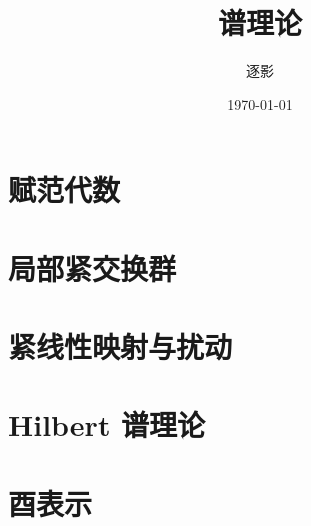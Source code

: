 \documentclass[UTF8,10pt, a4paper, oneside,scheme=plain]{ctexbook}
\author{逐影}
\title{\Huge\textbf{谱理论}}
\date{\today}
\begin{document}
\frontmatter
\maketitle
\tableofcontents
\mainmatter

\part{赋范代数}


\part{局部紧交换群}


\part{紧线性映射与扰动}


\part{Hilbert 谱理论}


\part{酉表示}


\backmatter
\end{document}
